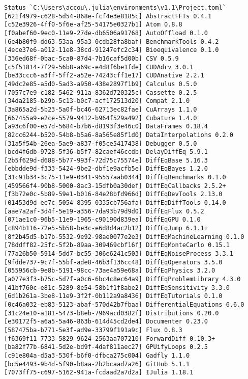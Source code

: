 \documentclass[12pt,a4paper]{article}
\begin{document}
\begin{verbatim}
Status `C:\Users\accou\.julia\environments\v1.1\Project.toml`
[621f4979-c628-5d54-868e-fcf4e3e8185c] AbstractFFTs 0.4.1
[c52e3926-4ff0-5f6e-af25-54175e0327b1] Atom 0.8.8
[f0abef60-9ec0-11e9-27de-db6506a91768] AutoOffload 0.1.0
[6e4b80f9-dd63-53aa-95a3-0cdb28fa8baf] BenchmarkTools 0.4.2
[4ece37e6-a012-11e8-38cd-91247efc2c34] Bioequivalence 0.1.0
[336ed68f-0bac-5ca0-87d4-7b16caf5d00b] CSV 0.5.9
[c5f51814-7f29-56b8-a69c-e4d8f6be1fde] CUDAdrv 3.0.1
[be33ccc6-a3ff-5ff2-a52e-74243cff1e17] CUDAnative 2.2.1
[49dc2e85-a5d0-5ad3-a950-438e2897f1b9] Calculus 0.5.0
[7057c7e9-c182-5462-911a-8362d720325c] Cassette 0.2.5
[34da2185-b29b-5c13-b0c7-acf172513d20] Compat 2.1.0
[3a865a2d-5b23-5a0f-bc46-62713ec82fae] CuArrays 1.1.0
[667455a9-e2ce-5579-9412-b964f529a492] Cubature 1.4.0
[a93c6f00-e57d-5684-b7b6-d8193f3e46c0] DataFrames 0.18.4
[82cc6244-b520-54b8-b5a6-8a565e85f1d0] DataInterpolations 0.2.0
[31a5f54b-26ea-5ae9-a837-f05ce5417438] Debugger 0.5.0
[bcd4f6db-9728-5f36-b5f7-82caef46ccdb] DelayDiffEq 5.9.1
[2b5f629d-d688-5b77-993f-72d75c75574e] DiffEqBase 5.16.3
[ebbdde9d-f333-5424-9be2-dbf1e9acfb5e] DiffEqBayes 1.2.0
[31c91b34-3c75-11e9-0341-95557aab0344] DiffEqBenchmarks 0.1.0
[459566f4-90b8-5000-8ac3-15dfb0a30def] DiffEqCallbacks 2.5.2+
[f3b72e0c-5b89-59e1-b016-84e28bfd966d] DiffEqDevTools 2.13.0
[01453d9d-ee7c-5054-8395-0335cb756afa] DiffEqDiffTools 0.14.0
[aae7a2af-3d4f-5e19-a356-7da93b79d9d0] DiffEqFlux 0.5.2
[071ae1c0-96b5-11e9-1965-c90190d839ea] DiffEqGPU 0.1.0
[c894b116-72e5-5b58-be3c-e6d8d4ac2b12] DiffEqJump 6.1.1+
[8f2b45d5-b17b-5532-9e92-98ae0077e2e3] DiffEqMachineLearning 0.1.0
[78ddff82-25fc-5f2b-89aa-309469cbf16f] DiffEqMonteCarlo 0.15.1
[77a26b50-5914-5dd7-bc55-306e6241c503] DiffEqNoiseProcess 3.3.1
[9fdde737-9c7f-55bf-ade8-46b3f136cc48] DiffEqOperators 3.5.0
[055956cb-9e8b-5191-98cc-73ae4a59e68a] DiffEqPhysics 3.2.0
[a077e3f3-b75c-5d7f-a0c6-6bc4c8ec64a9] DiffEqProblemLibrary 4.3.0
[41bf760c-e81c-5289-8e54-58b1f1f8abe2] DiffEqSensitivity 3.3.0
[6d1b261a-3be8-11e9-3f2f-0b112a9a8436] DiffEqTutorials 0.1.0
[0c46a032-eb83-5123-abaf-570d42b7fbaa] DifferentialEquations 6.6.0
[31c24e10-a181-5473-b8eb-7969acd0382f] Distributions 0.20.0
[e30172f5-a6a5-5a46-863b-614d45cd2de4] Documenter 0.23.0
[587475ba-b771-5e3f-ad9e-33799f191a9c] Flux 0.8.3
[f6369f11-7733-5829-9624-2563aa707210] ForwardDiff 0.10.3+
[ba82f77b-6841-5d2e-bd9f-4daf811aec27] GPUifyLoops 0.2.5
[c91e804a-d5a3-530f-b6f0-dfbca275c004] Gadfly 1.1.0
[bc5e4493-9b4d-5f90-b8aa-2b2bcaad7a26] GitHub 5.1.1
[7073ff75-c697-5162-941a-fcdaad2a7d2a] IJulia 1.18.1

\end{verbatim}
\end{document}

